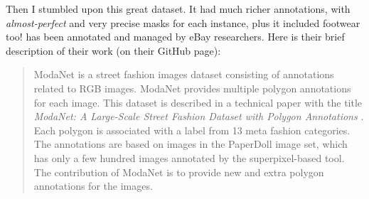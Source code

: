 \begin{table}[H]
	\centering
	\caption{Comparison of ModaNet with other datasets for fashion parsing. ModaNet surpasses previous datasets in terms of annotation granularity and scale. \checkmark$^*$  indicates the annotations are not included in the original dataset. The count of categories excludes non-fashion categories, such as \emph{hair}, \emph{skin}, \emph{face}, \emph{background} and \emph{null}.}
	\label{t:datasets}
\end{table}

Then I stumbled upon this great dataset. It had much richer annotations, with \emph{almost-perfect} and very precise masks for each instance, plus it included footwear too!
\modanet has been annotated and managed by eBay researchers.
Here is their brief description of their work (on their GitHub page):
\begin{quotation}
	ModaNet is a street fashion images dataset consisting of annotations related to RGB images. ModaNet provides multiple polygon annotations for each image. This dataset is described in a technical paper with the title \emph{ModaNet: A Large-Scale Street Fashion Dataset with Polygon Annotations} \cite{zheng/2018acmmm}. Each polygon is associated with a label from 13 meta fashion categories. The annotations are based on images in the PaperDoll image set, which has only a few hundred images annotated by the superpixel-based tool. The contribution of ModaNet is to provide new and extra polygon annotations for the images.
\end{quotation}


